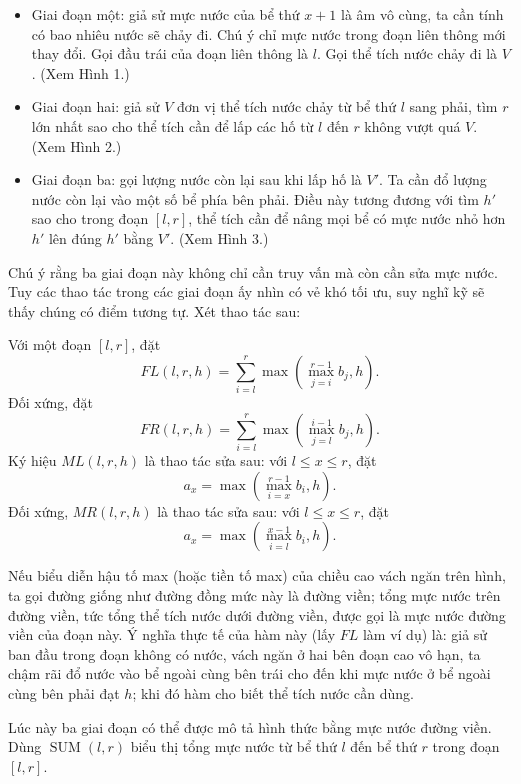\documentclass[11pt]{article}
\DeclareMathOperator{\SUM}{SUM}
\begin{document}
\begin{itemize}
  \item Giai đoạn một: giả sử mực nước của bể thứ \(x+1\) là âm vô cùng, ta
        cần tính có bao nhiêu nước sẽ chảy đi. Chú ý chỉ mực nước trong đoạn
        liên thông mới thay đổi. Gọi đầu trái của đoạn liên thông là \(l\).
        Gọi thể tích nước chảy đi là \(V\). (Xem Hình 1.)
  \item Giai đoạn hai: giả sử \(V\) đơn vị thể tích nước chảy từ bể thứ \(l\)
        sang phải, tìm \(r\) lớn nhất sao cho thể tích cần để lấp các hố từ
        \(l\) đến \(r\) không vượt quá \(V\). (Xem Hình 2.)
  \item Giai đoạn ba: gọi lượng nước còn lại sau khi lấp hố là \(V'\). Ta cần
        đổ lượng nước còn lại vào một số bể phía bên phải. Điều này tương
        đương với tìm \(h'\) sao cho trong đoạn \([l,r]\), thể tích cần để
        nâng mọi bể có mực nước nhỏ hơn \(h'\) lên đúng \(h'\) bằng \(V'\).
        (Xem Hình 3.)
\end{itemize}

Chú ý rằng ba giai đoạn này không chỉ cần truy vấn mà còn cần sửa mực nước.
Tuy các thao tác trong các giai đoạn ấy nhìn có vẻ khó tối ưu, suy nghĩ kỹ
sẽ thấy chúng có điểm tương tự. Xét thao tác sau:

Với một đoạn \([l,r]\), đặt
\[
  FL(l,r,h)=\sum_{i=l}^{r}\max\left(\max_{j=i}^{r-1} b_j,h\right).
\]
Đối xứng, đặt
\[
  FR(l,r,h)=\sum_{i=l}^{r}\max\left(\max_{j=l}^{i-1} b_j,h\right).
\]
Ký hiệu \(ML(l,r,h)\) là thao tác sửa sau: với \(l\le x\le r\), đặt
\[
  a_x=\max\left(\max_{i=x}^{r-1} b_i,h\right).
\]
Đối xứng, \(MR(l,r,h)\) là thao tác sửa sau: với \(l\le x\le r\), đặt
\[
  a_x=\max\left(\max_{i=l}^{x-1} b_i,h\right).
\]

Nếu biểu diễn hậu tố max (hoặc tiền tố max) của chiều cao vách ngăn trên hình,
ta gọi đường giống như đường đồng mức này là đường viền; tổng mực nước trên
đường viền, tức tổng thể tích nước dưới đường viền, được gọi là mực nước
đường viền của đoạn này. Ý nghĩa thực tế của hàm này (lấy \(FL\) làm ví dụ)
là: giả sử ban đầu trong đoạn không có nước, vách ngăn ở hai bên đoạn cao vô
hạn, ta chậm rãi đổ nước vào bể ngoài cùng bên trái cho đến khi mực nước ở
bể ngoài cùng bên phải đạt \(h\); khi đó hàm cho biết thể tích nước cần dùng.

Lúc này ba giai đoạn có thể được mô tả hình thức bằng mực nước đường viền.
Dùng \(\SUM(l,r)\) biểu thị tổng mực nước từ bể thứ \(l\) đến bể thứ \(r\)
trong đoạn \([l,r]\).
\end{document}

